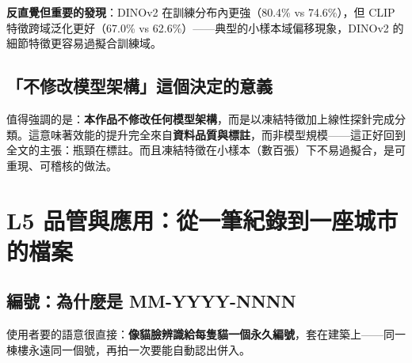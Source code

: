 \documentclass[11pt,a4paper,fontset=windows]{ctexart}
\newcommand{\key}[1]{\textbf{\color{ink}#1}}
\begin{document}
\key{反直覺但重要的發現}：DINOv2 在訓練分布內更強（80.4\% vs 74.6\%），但 CLIP 特徵跨域泛化更好（67.0\% vs 62.6\%）——典型的小樣本域偏移現象，DINOv2 的細節特徵更容易過擬合訓練域。

\begin{center}
\end{center}

\subsection{「不修改模型架構」這個決定的意義}

值得強調的是：\textbf{本作品不修改任何模型架構}，而是以凍結特徵加上線性探針完成分類。這意味著效能的提升完全來自\textbf{資料品質與標註}，而非模型規模——這正好回到全文的主張：瓶頸在標註。而且凍結特徵在小樣本（數百張）下不易過擬合，是可重現、可稽核的做法。

\section{L5 品管與應用：從一筆紀錄到一座城市的檔案}

\subsection{編號：為什麼是 MM-YYYY-NNNN}

使用者要的語意很直接：\textbf{像貓臉辨識給每隻貓一個永久編號}，套在建築上——同一棟樓永遠同一個號，再拍一次要能自動認出併入。
\end{document}
